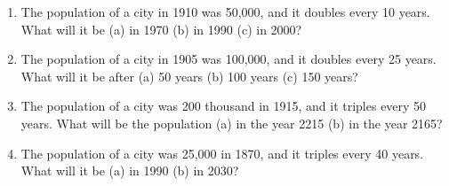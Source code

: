 \documentclass{article}
\begin{document}
\begin{enumerate}
\item The population of a city in 1910 was 50,000, and it doubles every 10 years. What will it be (a) in 1970 (b) in 1990 (c) in 2000?
\begin{enumerate}
\end{enumerate}
\item The population of a city in 1905 was 100,000, and it doubles every 25 years. What will it be after (a) 50 years (b) 100 years (c) 150 years?
\begin{enumerate}
\end{enumerate}
\item The population of a city was 200 thousand in 1915, and it triples every 50 years. What will be the population (a) in the year 2215 (b) in the year 2165?
\begin{enumerate}
\end{enumerate}
\item The population of a city was 25,000 in 1870, and it triples every 40 years. What will it be (a) in 1990 (b) in 2030?
\begin{enumerate}
\end{enumerate}
\end{enumerate}
\end{document}
